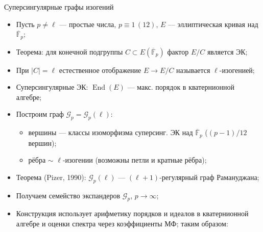 \documentclass[serif, aspectratio=169]{beamer}
\begin{document}
\begin{frame}{Суперсингулярные графы изогений}
    \begin{itemize}
        \item Пусть $p\ne\ell$ --- простые числа, $p\equiv1\,(12)$, $E$ --- эллиптическая кривая над $\overline{\mathbb F}_p$;
        \item Теорема: для конечной подгруппы $C\subset E(\overline{\mathbb F}_p)$ фактор $E/C$ является ЭК;
        \item При $|C|=\ell$ естественное отображение $E\to E/C$ называется $\ell$-изогенией;
        \item Суперсингулярные ЭК: $\operatorname{End}(E)$ --- макс. порядок в кватернионной алгебре;
        \item Построим граф $\mathcal{G}_p=\mathcal{G}_p(\ell)$:
        \begin{itemize}
            \item вершины --- классы изоморфизма суперсинг. ЭК над $\overline{\mathbb F}_p$ ($(p-1)/12$ вершин);
            \item рёбра $\sim$ $\ell$-изогении (возможны петли и кратные рёбра);
        \end{itemize}
        \item Теорема (Pizer, 1990): $\mathcal{G}_p(\ell)$ --- $(\ell+1)$-регулярный граф Рамануджана;
        \item Получаем семейство экспандеров $\mathcal{G}_p$, $p\to\infty$;
        \item Конструкция использует арифметику порядков и идеалов в кватернионной алгебре и оценки спектра через коэффициенты МФ; таким образом:
        \begin{actionenv}
            \begin{center}
\end{center}
\end{actionenv}
\end{itemize}
\end{frame}
\end{document}
